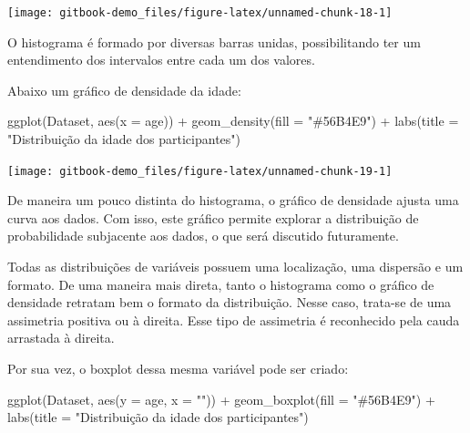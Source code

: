 \documentclass[
]{book}
\newenvironment{Shaded}{\begin{snugshade}}{\end{snugshade}}
\newcommand{\AttributeTok}[1]{\textcolor[rgb]{0.77,0.63,0.00}{#1}}
\newcommand{\FunctionTok}[1]{\textcolor[rgb]{0.00,0.00,0.00}{#1}}
\newcommand{\NormalTok}[1]{#1}
\newcommand{\SpecialCharTok}[1]{\textcolor[rgb]{0.00,0.00,0.00}{#1}}
\newcommand{\StringTok}[1]{\textcolor[rgb]{0.31,0.60,0.02}{#1}}
\begin{document}
\begin{center}\texttt{[image: gitbook-demo\_files/figure-latex/unnamed-chunk-18-1]} \end{center}

O histograma é formado por diversas barras unidas, possibilitando ter um entendimento dos intervalos entre cada um dos valores.

Abaixo um gráfico de densidade da idade:

\begin{Shaded}
\begin{Highlighting}[]
\FunctionTok{ggplot}\NormalTok{(Dataset, }\FunctionTok{aes}\NormalTok{(}\AttributeTok{x =}\NormalTok{ age)) }\SpecialCharTok{+}
  \FunctionTok{geom\_density}\NormalTok{(}\AttributeTok{fill =} \StringTok{"\#56B4E9"}\NormalTok{) }\SpecialCharTok{+}
  \FunctionTok{labs}\NormalTok{(}\AttributeTok{title =} \StringTok{"Distribuição da idade dos participantes"}\NormalTok{)}
\end{Highlighting}
\end{Shaded}

\begin{center}\texttt{[image: gitbook-demo\_files/figure-latex/unnamed-chunk-19-1]} \end{center}

De maneira um pouco distinta do histograma, o gráfico de densidade ajusta uma curva aos dados. Com isso, este gráfico permite explorar a distribuição de probabilidade subjacente aos dados, o que será discutido futuramente.

Todas as distribuições de variáveis possuem uma localização, uma dispersão e um formato. De uma maneira mais direta, tanto o histograma como o gráfico de densidade retratam bem o formato da distribuição. Nesse caso, trata-se de uma assimetria positiva ou à direita. Esse tipo de assimetria é reconhecido pela cauda arrastada à direita.

Por sua vez, o boxplot dessa mesma variável pode ser criado:

\begin{Shaded}
\begin{Highlighting}[]
\FunctionTok{ggplot}\NormalTok{(Dataset, }\FunctionTok{aes}\NormalTok{(}\AttributeTok{y =}\NormalTok{ age, }\AttributeTok{x =} \StringTok{""}\NormalTok{)) }\SpecialCharTok{+}
  \FunctionTok{geom\_boxplot}\NormalTok{(}\AttributeTok{fill =} \StringTok{"\#56B4E9"}\NormalTok{) }\SpecialCharTok{+}
  \FunctionTok{labs}\NormalTok{(}\AttributeTok{title =} \StringTok{"Distribuição da idade dos participantes"}\NormalTok{)}
\end{Highlighting}
\end{Shaded}
\end{document}
